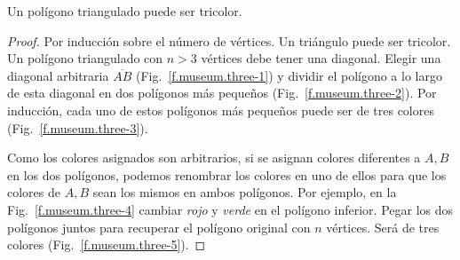 \begin{theorem}
Un polígono triangulado puede ser tricolor.\label{thm.colored}
\end{theorem}

\begin{proof}
Por inducción sobre el número de vértices. Un triángulo puede ser tricolor. Un polígono triangulado con $n>3$ vértices debe tener una diagonal. Elegir una diagonal arbitraria $\overline{AB}$ (Fig.~\ref{f.museum.three-1}) y dividir el polígono a lo largo de esta diagonal en dos polígonos más pequeños (Fig.~\ref{f.museum.three-2}). Por inducción, cada uno de estos polígonos más pequeños puede ser de tres colores (Fig.~\ref{f.museum.three-3}).

Como los colores asignados son arbitrarios, si se asignan colores diferentes a $A,B$ en los dos polígonos, podemos renombrar los colores en uno de ellos para que los colores de $A,B$ sean los mismos en ambos polígonos. Por ejemplo, en la Fig.~\ref{f.museum.three-4} cambiar \emph{rojo} y \emph{verde} en el polígono inferior.
Pegar los dos polígonos juntos para recuperar el polígono original con $ n $ vértices. Será de tres colores (Fig.~\ref{f.museum.three-5}).
\end{proof}

